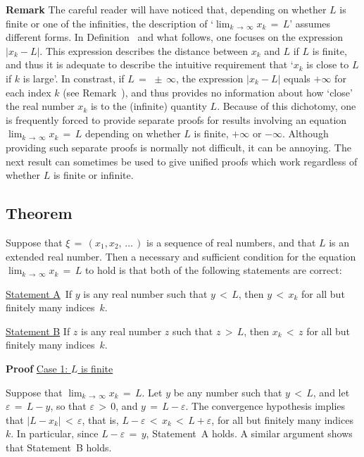         {\bf Remark} The careful reader will have noticed that, depending on whether $L$ is finite or one of the infinities,
    the description of `$\lim_{k \,{\rightarrow}\, {\infty}} x_{k} \,=\, L$' assumes different forms. In Definition~ and what follows, one focuses on the expression $|x_{k}-L|$.
    This expression describes the distance between $x_{k}$ and $L$ if $L$ is finite, and thus it is adequate to describe the intuitive requirement that `$x_{k}$ is close to $L$ if $k$ is large'.
    In constrast, if $L \,=\,  \,{\pm}\, {\infty}$, the expression $|x_{k}-L|$ equals $+{\infty}$ for each index $k$ (see Remark~),
    and thus provides no information about how `close' the real number $x_{k}$ is to the (infinite) quantity $L$. Because of this dichotomy,
    one is frequently forced to provide separate proofs for results involving an equation $\lim_{k \,{\rightarrow}\, {\infty}} x_{k} \,=\, L$
    depending on whether $L$ is finite, $+{\infty}$ or $-{\infty}$. Although providing such separate proofs is normally not difficult, it can be annoying.
    The next result can sometimes be used to give unified proofs which work regardless of whether $L$ is finite or infinite.

\VV

            \subsection{\small{\bf Theorem}}
            \label{ThmC40.80}

\V

        Suppose that ${\xi} \,=\, (x_{1},x_{2},\,{\ldots}\,)$ is a sequence of real numbers, and that $L$ is an extended real number.
    Then a necessary and sufficient condition for the equation $\lim_{k \,{\rightarrow}\, {\infty}} x_{k} \,=\, L$ to hold is that both of the following statements are correct:

\VA

        \h \underline{Statement A}\, If $y$ is any real number such that $y\,<\,L$,
    then $y\,<\,x_{k}$ for all but finitely many indices~$k$.

\VA

        \h \underline{Statement B} If $z$ is any real number $z$ such that $z\,>\,L$,
        then $x_{k}\,<\,z$ for all but finitely many indices~$k$.

\V

        {\bf Proof} \underline{Case 1: $L$ is finite}

        Suppose that $\lim_{k \,{\rightarrow}\, {\infty}} x_{k} \,=\, L$.
    Let $y$ be any number such that $y\,<\,L$, and let ${\varepsilon} \,=\, L-y$, so that ${\varepsilon}\,>\,0$, and $y \,=\, L-{\varepsilon}$.
    The convergence hypothesis implies that $|L-x_{k}|\,<\,{\varepsilon}$, that is,
    $L-{\varepsilon}\,<\,x_{k}\,<\,L+{\varepsilon}$, for all but finitely many indices~$k$.
    In particular, since $L-{\varepsilon} \,=\, y$, Statement~A holds. A similar argument shows that Statement~B holds.

